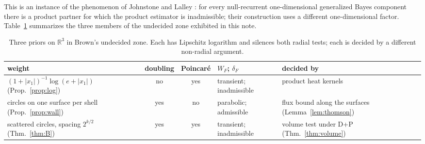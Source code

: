 \documentclass[11pt]{amsart}
\newcommand{\R}{\mathbb{R}}
\newcommand{\abs}[1]{\lvert #1\rvert}
\theoremstyle{plain}
\theoremstyle{definition}
\theoremstyle{remark}
\begin{document}
This is an instance of the phenomenon of Johnstone and Lalley
\cite[Thm.~1.1]{johnstonelalley1984}: for every null-recurrent one-dimensional
generalized Bayes component there is a product partner for which the product
estimator is inadmissible; their construction uses a different one-dimensional
factor. Table~\ref{tab:zone} summarizes the three members of the undecided zone
exhibited in this note.

\begin{table}[t]
\caption{Three priors on $\R^3$ in Brown's undecided zone. Each has Lipschitz
logarithm and silences both radial tests; each is decided by a different
non-radial argument.}
\label{tab:zone}
\small
\begin{tabular}{@{}>{\raggedright\arraybackslash}p{}cc>{\raggedright\arraybackslash}p{}>{\raggedright\arraybackslash}p{}@{}}
\toprule
weight & doubling & Poincar\'e & $W_F$; $\delta_F$ & decided by \\
\midrule
$(1+\abs{x_1})^{-1}\log(e+\abs{x_1})$ (Prop.~\ref{prop:log}) & no & yes & transient; inadmissible & product heat kernels \\
circles on one surface per shell (Prop.~\ref{prop:wall}) & yes & no & parabolic; admissible & flux bound along the surfaces (Lemma~\ref{lem:thomson}) \\
scattered circles, spacing $2^{k/2}$ (Thm.~\ref{thm:B}) & yes & yes & transient; inadmissible & volume test under D+P (Thm.~\ref{thm:volume}) \\
\bottomrule
\end{tabular}
\end{table}
\end{document}
